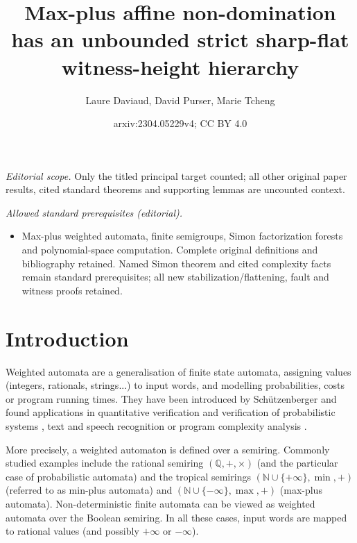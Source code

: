 \documentclass[10pt,a4paper]{amsart}
\title{Max-plus affine non-domination has an unbounded strict sharp-flat witness-height hierarchy}
\author{Laure Daviaud, David Purser, Marie Tcheng}
\date{arxiv:2304.05229v4; CC BY 4.0}
\theoremstyle{definition}
\numberwithin{equation}{section}
\theoremstyle{remark}
\theoremstyle{remark}
\begin{document}
\maketitle
\noindent\textit{Editorial scope.} Only the titled principal target counted; all other original paper results, cited standard theorems and supporting lemmas are uncounted context.\par\medskip
\noindent\textit{Allowed standard prerequisites (editorial).}\begin{itemize}
\item Max-plus weighted automata, finite semigroups, Simon factorization forests and polynomial-space computation. Complete original definitions and bibliography retained. Named Simon theorem and cited complexity facts remain standard prerequisites; all new stabilization/flattening, fault and witness proofs retained.
\end{itemize}\medskip
\section{Introduction}

Weighted automata are a generalisation of finite state automata, assigning values (integers, rationals, strings...) to input words, and modelling probabilities, costs or program running times. They have been introduced by Sch\"utzenberger \cite{Schutzenberger61b} and found applications in quantitative verification \cite{ChatterjeeDH10} and verification of probabilistic systems \cite{Vardi85}, text and speech recognition \cite{MohriPR02} or program complexity analysis  \cite{ColcombetDZ14}. 

More precisely, a weighted automaton is defined over a semiring. Commonly studied examples include the rational semiring $(\mathbb{Q},+,\times)$ (and the particular case of probabilistic automata) and the tropical semirings $(\mathbb{N}\cup\{+\infty\},\min,+)$ (referred to as min-plus automata) and  $(\mathbb{N}\cup\{-\infty\},\max,+)$ (max-plus automata). Non-deterministic finite automata can be viewed as weighted automata over the Boolean semiring. In all these cases, input words are mapped to rational values (and possibly $+\infty$ or $-\infty$).
\end{document}
